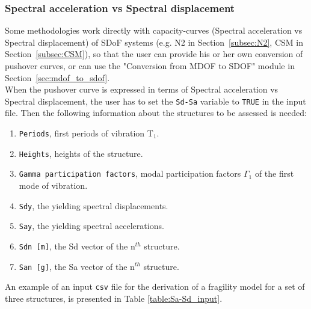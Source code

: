 \subsubsection{Spectral acceleration vs Spectral displacement}
\label{subsubsec:Sa-Sd}
Some methodologies work directly with capacity-curves (Spectral acceleration vs Spectral displacement) of SDoF systems (e.g. N2 in Section~\ref{subsec:N2}, CSM in Section~\ref{subsec:CSM}), so that the user can provide his or her own conversion of pushover curves, or can use the "Conversion from MDOF to SDOF" module in Section~\ref{sec:mdof_to_sdof}.\\
When the pushover curve is expressed in terms of Spectral acceleration vs Spectral displacement, the user has to set the \verb=Sd-Sa= variable to \verb=TRUE= in the input file. Then the following information about the structures to be assessed is needed:\\

\begin{enumerate}
\item \verb=Periods=, first periods of vibration T$_1$.
\item \verb=Heights=, heights of the structure.
\item \verb=Gamma participation factors=, modal participation factors $\Gamma_1$ of the first mode of vibration.
\item \verb=Sdy=, the yielding spectral displacements.
\item \verb=Say=, the yielding spectral accelerations.
\item \verb=Sdn [m]=, the Sd vector of the n$^{th}$ structure.
\item \verb=San [g]=, the Sa vector of the n$^{th}$ structure. \\
\end{enumerate}

An example of an input \verb=csv= file for the derivation of a fragility model for a set of three structures, is presented in Table \ref{table:Sa-Sd_input}.


